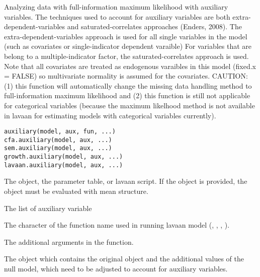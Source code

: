 \documentclass[a4paper]{book}
\begin{document}
\begin{Description}\relax
Analyzing data with full-information maximum likelihood with auxiliary variables. The techniques used to account for auxiliary variables are both extra-dependent-variables and saturated-correlates approaches (Enders, 2008). The extra-dependent-variables approach is used for all single variables in the model (such as covariates or single-indicator dependent varaible) For variables that are belong to a multiple-indicator factor, the saturated-correlates approach is used. Note that all covariates are treated as endogenous varaibles in this model (fixed.x = FALSE) so multivariate normality is assumed for the covariates. CAUTION: (1) this function will automatically change the missing data handling method to full-information maximum likelihood and (2) this function is still not applicable for categorical variables (because the maximum likelhood method is not available in lavaan for estimating models with categorical variables currently).
\end{Description}
%
\begin{Usage}
\begin{verbatim}
auxiliary(model, aux, fun, ...)
cfa.auxiliary(model, aux, ...)
sem.auxiliary(model, aux, ...)
growth.auxiliary(model, aux, ...)
lavaan.auxiliary(model, aux, ...)
\end{verbatim}
\end{Usage}
%
\begin{Arguments}
\begin{ldescription}
\item[\code{model}] 
The  object, the parameter table, or lavaan script. If the  object is provided, the  object must be evaluated with mean structure.

\item[\code{aux}] 
The list of auxiliary variable

\item[\code{fun}] 
The character of the function name used in running lavaan model (, , , ). 

\item[\code{...}] 
The additional arguments in the  function.

\end{ldescription}
\end{Arguments}
%
\begin{Value}
The  object which contains the original  object and the additional values of the null model, which need to be adjusted to account for auxiliary variables.
\end{Value}
\end{document}
